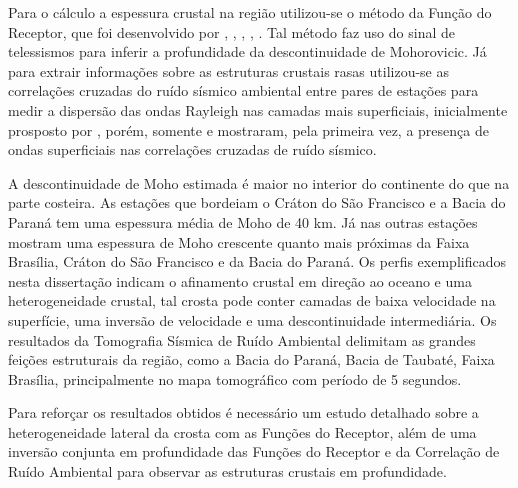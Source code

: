 Para o cálculo a espessura crustal na região utilizou-se o método da Função do Receptor, que foi desenvolvido por \cite{clayton_source_1976}, \cite{Langston_1977}, \cite{ammon_isolation_1991}, \cite{cassidy_numerical_1992}, \cite{Zhu_Kanamori_2000}. Tal método faz uso do sinal de telessismos para inferir a profundidade da descontinuidade de Mohorovicic. Já para extrair informações sobre as estruturas crustais rasas utilizou-se as correlações cruzadas do ruído sísmico ambiental entre pares de estações para medir a dispersão das ondas Rayleigh nas camadas mais superficiais, inicialmente prosposto por \cite{aki_space_1957}, porém, somente \cite{campillo_long-range_2003}  e \cite{shapiro_emergence_2004} mostraram, pela primeira vez, a  presença de ondas superficiais nas correlações cruzadas de ruído sísmico.

A descontinuidade de Moho estimada é maior no interior do continente do que na parte costeira. As estações que bordeiam o Cráton do São Francisco e a Bacia do Paraná tem uma espessura média de Moho de 40 km. Já nas outras estações mostram uma espessura de Moho crescente quanto mais próximas da Faixa Brasília, Cráton do São Francisco e da Bacia do Paraná. Os perfis exemplificados nesta dissertação indicam o afinamento crustal em direção ao oceano e uma heterogeneidade crustal, tal crosta pode conter camadas de baixa velocidade na superfície, uma inversão de velocidade e uma descontinuidade intermediária. Os resultados da Tomografia Sísmica de Ruído Ambiental delimitam as grandes feições estruturais da região, como a Bacia do Paraná, Bacia de Taubaté, Faixa Brasília, principalmente no mapa tomográfico com período de 5 segundos.

Para reforçar os resultados obtidos é necessário um estudo detalhado sobre a heterogeneidade lateral da crosta com as Funções do Receptor, além de uma inversão conjunta em profundidade das Funções do Receptor e da Correlação de Ruído Ambiental para observar as estruturas crustais em profundidade.